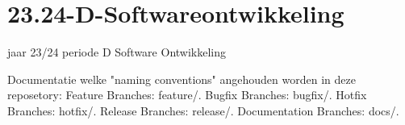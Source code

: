 \chapter{23.24-\/D-\/\+Softwareontwikkeling}
\hypertarget{md__c_1_2_users_2miche_2_documents_2_repositories_223_824-_d-_softwareontwikkeling_2_r_e_a_d_m_e}{}\label{md__c_1_2_users_2miche_2_documents_2_repositories_223_824-_d-_softwareontwikkeling_2_r_e_a_d_m_e}
\label{md__c_1_2_users_2miche_2_documents_2_repositories_223_824-_d-_softwareontwikkeling_2_r_e_a_d_m_e_autotoc_md0}%
%
jaar 23/24 periode D Software Ontwikkeling

Documentatie welke "{}naming conventions"{} angehouden worden in deze reposetory\+: Feature Branches\+: feature/. Bugfix Branches\+: bugfix/. Hotfix Branches\+: hotfix/. Release Branches\+: release/. Documentation Branches\+: docs/. 